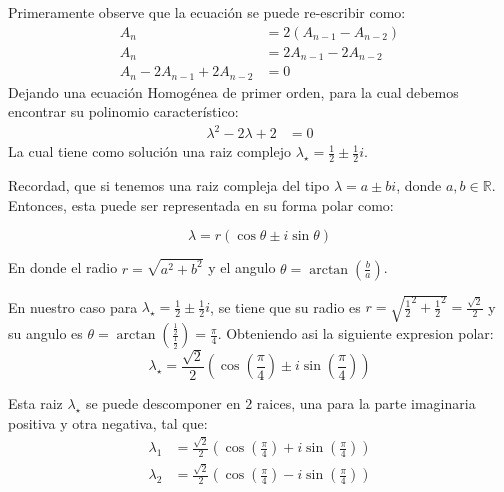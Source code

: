 \begin{solution}
Primeramente observe que la ecuación se puede re-escribir como:
\begin{align*}
    A_n &= 2(A_{n-1} - A_{n-2})\\
    A_n &= 2A_{n-1} - 2A_{n-2}\\
    A_n - 2A_{n-1} + 2A_{n-2} &= 0
\end{align*}
Dejando una ecuación Homogénea de primer orden, para la cual debemos encontrar su polinomio característico:
\begin{align*}
    \lambda^2 -2\lambda +2 &= 0
\end{align*}
La cual tiene como solución una raiz complejo $\lambda_{\star} = \frac{1}{2} \pm \frac{1}{2}i$. 

Recordad, que si tenemos una raiz compleja del tipo $\lambda = a \pm bi$, donde $a,b \in \mathbb{R}$. Entonces, esta puede ser representada en su forma polar como:

$$\lambda = r(\cos{\theta} \pm i\sin{\theta})$$

En donde el radio $r=\sqrt{a^2 + b^2}$ y el angulo $\theta = \arctan\left(\frac{b}{a}\right)$.

En nuestro caso para $\lambda_{\star} = \frac{1}{2} \pm \frac{1}{2}i$, se tiene que su radio es $r = \sqrt{\frac{1}{2}^2 + \frac{1}{2}^2} =\frac{\sqrt{2}}{2}$ y su angulo es $\theta = \arctan\left(\frac{\frac{1}{2}}{\frac{1}{2}}\right)=\frac{\pi}{4}$. Obteniendo asi la siguiente expresion polar:
$$\lambda_{\star} = \frac{\sqrt{2}}{2}(\cos{\left( \frac{\pi}{4} \right)} \pm i\sin{\left( \frac{\pi}{4} \right)})$$

Esta raiz $\lambda_{\star}$ se puede descomponer en $2$ raices, una para la parte imaginaria positiva y otra negativa, tal que:
\begin{align*}
    \lambda_1 &= \frac{\sqrt{2}}{2}(\cos{\left( \frac{\pi}{4} \right)}+i\sin{\left(\frac{\pi}{4} \right)}) \\
    \lambda_2 &= \frac{\sqrt{2}}{2}(\cos{\left( \frac{\pi}{4} \right)}-i\sin{\left(\frac{\pi}{4} \right)}) 
\end{align*}


\end{solution}
